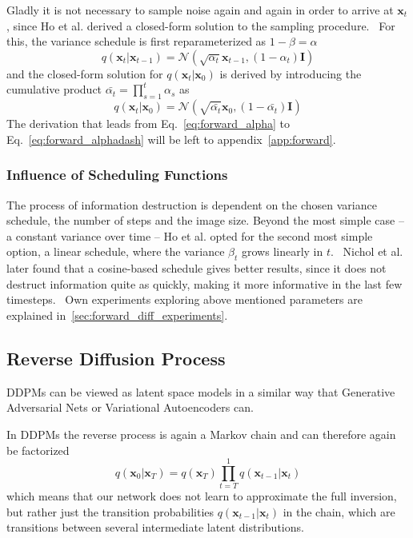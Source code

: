 Gladly it is not necessary to sample noise again and again in order to arrive at $\bm{x}_t$, since Ho et al. derived a closed-form solution to the sampling procedure.~\autocite{ho2020denoising} For this, the variance schedule is first reparameterized as $1-\beta = \alpha$
\begin{equation}
    q(\bm{x}_t | \bm{x}_{t-1}) = \mathcal{N}(\sqrt{\alpha_t} \bm{x}_{t-1}, (1-\alpha_t) \bm{I})
    \label{eq:forward_alpha}
\end{equation}
and the closed-form solution for $q(\bm{x}_t|\bm{x}_0)$ is derived by introducing the cumulative product $\bar{\alpha_t} = \prod_{s=1}^{t}\alpha_s$ as
\begin{equation}
    q(\bm{x}_t|\bm{x}_0) = \mathcal{N}(\sqrt{\bar{\alpha_t}}\bm{x}_0, (1-\bar{\alpha_t})\bm{I})
    \label{eq:forward_alphadash}
\end{equation}
The derivation that leads from Eq.~\ref{eq:forward_alpha} to Eq.~\ref{eq:forward_alphadash} will be left to appendix~\ref{app:forward}.

\subsubsection{Influence of Scheduling Functions}
The process of information destruction is dependent on the chosen variance schedule, the number of steps and the image size. Beyond the most simple case -- a constant variance over time -- Ho et al. opted for the second most simple option, a linear schedule, where the variance $\beta_t$ grows linearly in $t$.~\autocite{ho2020denoising} Nichol et al. later found that a cosine-based schedule gives better results, since it does not destruct information quite as quickly, making it more informative in the last few timesteps.~\autocite{nichol2021improved} Own experiments exploring above mentioned parameters are explained in~\ref{sec:forward_diff_experiments}.

\subsection{Reverse Diffusion Process}
DDPMs can be viewed as latent space models in a similar way that Generative Adversarial Nets or Variational Autoencoders can.~\autocite{goodfellow2014generative,kingma2022autoencoding}

In DDPMs the reverse process is again a Markov chain and can therefore again be factorized
\begin{equation}
    q(\bm{x}_0|\bm{x}_T) = q(\bm{x}_T) \prod_{t=T}^{1} q(\bm{x}_{t-1}|\bm{x}_{t})
\end{equation}
which means that our network does not learn to approximate the full inversion, but rather just the transition probabilities $q(\bm{x}_{t-1}|\bm{x}_{t})$ in the chain, which are transitions between several intermediate latent distributions.

